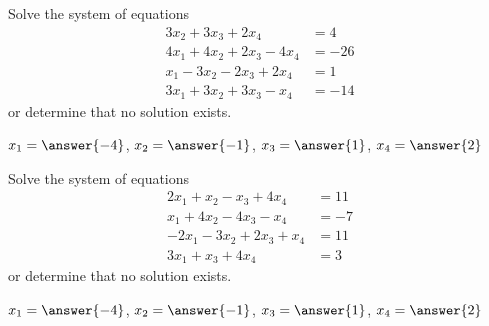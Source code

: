 \documentclass{ximera}
\begin{document}
\begin{exercise}%
    Solve the system of equations
    \begin{equation*}
        \begin{split}
            3x_2 + 3x_3 + 2x_4 &= 4 \\
            4x_1 + 4x_2 + 2x_3 - 4x_4 &= -26 \\
            x_1 - 3x_2 -2x_3 + 2x_4 &= 1 \\
            3x_1 + 3x_2 + 3x_3  - x_4 &= -14
        \end{split}
    \end{equation*}
    or determine that no solution exists. 
    \begin{multipleChoice}
    \end{multipleChoice}
    \begin{problem}
        $x_1 = \answer{-4}$, $x_2 = \answer{-1}$, $x_3 = \answer{1}$, $x_4 = \answer{2}$
    \end{problem}
\end{exercise}

\begin{exercise}%
    Solve the system of equations
    \begin{equation*}
        \begin{split}
            2x_1 + x_2 - x_3 + 4x_4 &= 11 \\
            x_1 + 4x_2  - 4x_3 - x_4 &= -7 \\
            -2x_1 - 3x_2 + 2x_3 + x_4 &= 11 \\
            3x_1 + x_3  + 4x_4 &= 3
        \end{split}
    \end{equation*}
    or determine that no solution exists. 
    \begin{multipleChoice}
    \end{multipleChoice}
    \begin{problem}
        $x_1 = \answer{-4}$, $x_2 = \answer{-1}$, $x_3 = \answer{1}$, $x_4 = \answer{2}$
    \end{problem}
\end{exercise}
\end{document}
